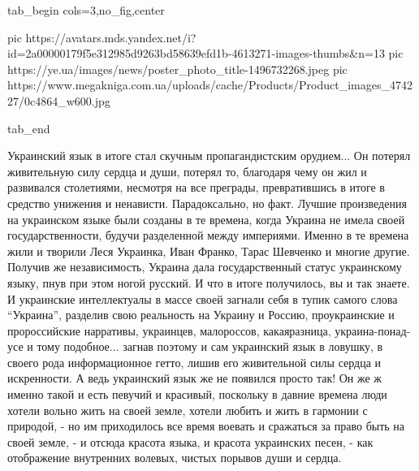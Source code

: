 \ifcmt
  tab_begin cols=3,no_fig,center

     pic https://avatars.mds.yandex.net/i?id=2a00000179f5e312985d9263bd58639efd1b-4613271-images-thumbs&n=13
		 pic https://ye.ua/images/news/poster_photo_title-1496732268.jpeg
		 pic https://www.megakniga.com.ua/uploads/cache/Products/Product_images_474227/0c4864_w600.jpg

  tab_end
\fi

Украинский язык в итоге стал скучным пропагандистским орудием... Он потерял
живительную силу сердца и души, потерял то, благодаря чему он жил и развивался
столетиями, несмотря на все преграды, превратившись в итоге в средство унижения
и ненависти. Парадоксально, но факт. Лучшие произведения на украинском языке
были созданы в те времена, когда Украина не имела своей государственности,
будучи разделенной между империями. Именно в те времена жили и творили Леся
Украинка, Иван Франко, Тарас Шевченко и многие другие. Получив же
независимость, Украина дала государственный статус украинскому языку, пнув при
этом ногой русский. И что в итоге получилось, вы и так знаете. И украинские
интеллектуалы в массе своей загнали себя в тупик самого слова
\enquote{Украина}, разделив свою реальность на Украину и Россию, проукраинские
и пророссийские нарративы, украинцев, малороссов, какаяразница,
украина-понад-усе и тому подобное... загнав поэтому и сам украинский язык в
ловушку, в своего рода информационное гетто, лишив его живительной силы сердца
и искренности. А ведь украинский язык же не появился просто так! Он же ж именно
такой и есть певучий и красивый, поскольку в давние времена люди хотели вольно
жить на своей земле, хотели любить и жить в гармонии с природой, - но им
приходилось все время воевать и сражаться за право быть на своей земле, - и
отсюда красота языка, и красота украинских песен, - как отображение внутренних
волевых, чистых порывов души и сердца.
